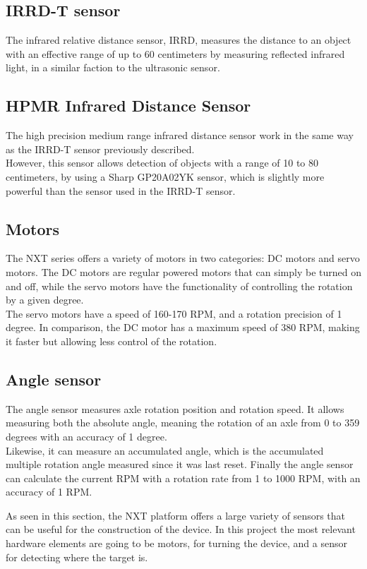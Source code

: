 \subsection*{IRRD-T sensor}
The infrared relative distance sensor, IRRD, measures the distance to an object with an effective range of up to 60 centimeters by measuring reflected infrared light, in a similar faction to the ultrasonic sensor.

\subsection*{HPMR Infrared Distance Sensor}
The high precision medium range infrared distance sensor work in the same way as the IRRD-T sensor previously described.\\
However, this sensor allows detection of objects with a range of 10 to 80 centimeters, by using a Sharp GP20A02YK sensor, which is slightly more powerful than the sensor used in the IRRD-T sensor.

\subsection*{Motors}
The NXT series offers a variety of motors in two categories: DC motors and servo motors.
The DC motors are regular powered motors that can simply be turned on and off, while the servo motors have the functionality of controlling the rotation by a given degree.\\
The servo motors have a speed of 160-170 RPM, and a rotation precision of 1 degree.
In comparison, the DC motor has a maximum speed of 380 RPM, making it faster but allowing less control of the rotation.

\subsection*{Angle sensor}
The angle sensor measures axle rotation position and rotation speed.
It allows measuring both the absolute angle, meaning the rotation of an axle from 0 to 359 degrees with an accuracy of 1 degree.\\
Likewise, it can measure an accumulated angle, which is the accumulated multiple rotation angle measured since it was last reset.
Finally the angle sensor can calculate the current RPM with a rotation rate from 1 to 1000 RPM, with an accuracy of 1 RPM.

As seen in this section, the NXT platform offers a large variety of sensors that can be useful for the construction of the device.
In this project the most relevant hardware elements are going to be motors, for turning  the device, and a sensor for detecting where the target is. 
